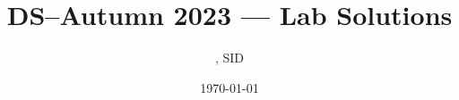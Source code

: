 \documentclass[UTF8]{ctexart}
\title{DS--Autumn 2023 --- Lab \Lab    Solutions} %
\author{\Name, SID \SID} %
\date{\today} %
\newenvironment{qparts}{\begin{enumerate}[{(}a{)}]}{\end{enumerate}} %
\newenvironment{Solutions}{\par{\bf Solutions}:}%
\begin{document}
\maketitle


\begin{abstract}
    1、问题描述：

        迷宫实验是取自心理学的一个古典实验。
        在该实验中，把一只老鼠从一个无顶大盒子的门放入，在盒中设置了许多墙，对行进方向形成了多处阻挡。
        盒子仅有一个出口，在出口处放置一块奶酪，吸引老鼠在迷宫中寻找道路以到达出口。
        对同一只老鼠重复进行上述实验，一直到老鼠从入口到出口，而不走错一步。
        老鼠经多次试验终于得到它学习走迷宫的路线。

    2、设计功能要求：

        迷宫由m行n列的二维数组设置，0表示无障碍，1表示有障碍。
        设入口为（1，1），出口为（m，n），每次只能从一个无障碍单元移到周围四个方向上任一无障碍单元。
        编程实现对任意设定的迷宫，求出一条从入口到出口的通路，或得出没有通路的结论。 

        算法输入：代表迷宫入口的坐标

        算法输出：穿过迷宫的结果。 

        算法要点：创建迷宫，试探法查找路。


\end{abstract}







\section*{1. 数据结构实现}
\begin{qparts}
    \item 功能实现


    \item 应用 
    
\end{qparts}



\subsection*{1.1 abc}

\begin{Solutions}
\begin{enumerate} %
\item 1
ArrayDeque.java
\begin{lstlisting}

\end{lstlisting}

\item 2

\begin{lstlisting}

\end{lstlisting}


\end{enumerate}
\end{Solutions}








\iffalse
\newpage
\section*{2.}
YOUR ANSWER GOES HERE
\fi
\end{document}
